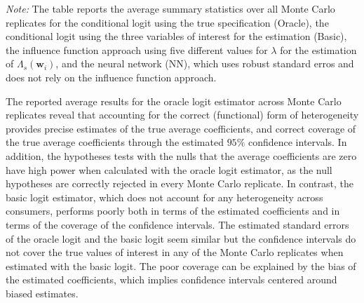 \documentclass[a4paper, 12pt]{article}
\begin{document}
\begin{table}[h!]
\centering	
\captionsetup{justification=centering} 
	\caption{Average Summary Statistics of 1000 Monte Carlo Replicates for Small Data and without Repeated Sample Splitting}
	\label{tab:MC_swissmetroMean}
	\small

 \begin{minipage}{0.827\textwidth} %
		{   \footnotesize \begin{singlespace}
\textit{Note:}		The table reports the average summary statistics over all Monte Carlo replicates for the conditional logit using the true specification (Oracle), the conditional logit using the three variables of interest for the estimation (Basic),  the influence function approach using five different values for $\lambda$ for the estimation of  $\Lambda_s(\bm{w}_i)$, and the neural network (NN), which uses robust standard erros and does not rely on the influence function approach. %
			\end{singlespace}
			\par}
	\end{minipage}
\end{table}
The reported average results for the oracle logit estimator across Monte Carlo replicates reveal that accounting for the correct (functional) form of heterogeneity provides precise estimates of the true average coefficients, and correct coverage of the true average coefficients through the estimated $95\%$ confidence intervals. In addition, the hypotheses tests with the nulls that the average coefficients are zero have high power when calculated with the oracle logit estimator, as the null hypotheses are correctly rejected in every Monte Carlo replicate. 
In contrast, the basic logit estimator, which does not account for any heterogeneity across consumers, performs poorly both in terms of the estimated coefficients and in terms of the coverage of the  confidence intervals. The estimated standard errors of the  oracle logit and the basic logit seem similar but the confidence intervals do not cover the true values of interest in any of the Monte Carlo replicates when estimated with the basic logit. The poor coverage can be explained by the bias of the estimated coefficients, which implies confidence intervals centered around biased estimates. 
\end{document}
